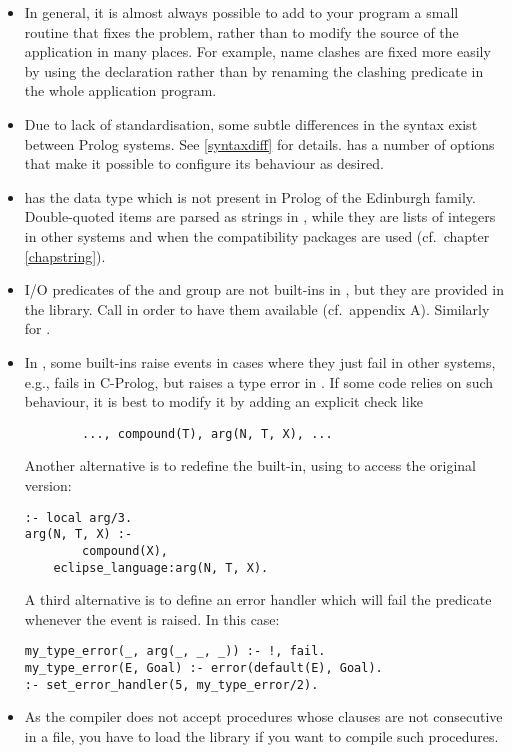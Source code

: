 \begin{itemize}
\item
In general, it is almost always possible to add to your program
a small routine that fixes the problem, rather than to modify
the source of the application in many places.
For example, name clashes are fixed more easily
by using the  declaration
rather than by renaming
the clashing predicate in the whole application program.

\item
Due to lack of standardisation, some subtle differences in the
syntax exist between Prolog systems. See \ref{syntaxdiff}
for details. {\eclipse} has a number of options that make it possible
to configure its behaviour as desired.

\item
{\eclipse} has the  data type which is not present in Prolog
of the Edinburgh family.
Double-quoted items are parsed as strings in {\eclipse}, while they are
lists of integers in other systems and when the compatibility
packages are used (cf.\ chapter \ref{chapstring}).

\item
I/O predicates of the  and  group are not built-ins
in {\eclipse}, but they are provided in the  library.
Call  in order to have them available (cf.\ appendix A).
Similarly for .

\item
In {\eclipse}, some built-ins raise events in cases where they just fail
in other systems, e.g.,  fails in C-Prolog, but
raises a type error in {\eclipse}.
If some code relies on such behaviour, it is best to modify it by
adding an explicit check like
\begin{verbatim}
        ..., compound(T), arg(N, T, X), ...
\end{verbatim}

Another alternative is to redefine the  built-in, using
 to access the original version:
\begin{verbatim}
:- local arg/3.
arg(N, T, X) :-
        compound(X),
	eclipse_language:arg(N, T, X).
\end{verbatim}

A third alternative
is to define an error handler which will fail the predicate
whenever the event is raised. In this case:
\begin{verbatim}
my_type_error(_, arg(_, _, _)) :- !, fail.
my_type_error(E, Goal) :- error(default(E), Goal).
:- set_error_handler(5, my_type_error/2).
\end{verbatim}

\item As the {\eclipse} compiler does not accept procedures whose clauses
are not consecutive in a file, you have to load the library 
if you want to compile such procedures.

\end{itemize}


